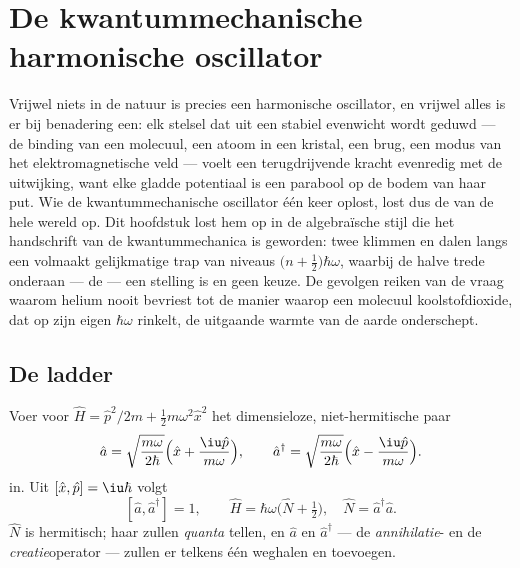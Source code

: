 \chapter{De kwantummechanische harmonische oscillator}\label{ch:b3:harmonic-oscillator}

Vrijwel niets in de natuur is precies een harmonische oscillator, en
vrijwel alles is er bij benadering een: elk stelsel dat uit een stabiel
evenwicht wordt geduwd --- de binding van een molecuul, een atoom in een
kristal, een brug, een modus van het elektromagnetische veld --- voelt een
terugdrijvende kracht evenredig met de uitwijking, want elke gladde
potentiaal is een parabool op de bodem van haar put. Wie de
kwantummechanische oscillator één keer oplost, lost dus de  van de hele wereld op. Dit hoofdstuk lost hem op in de
algebraïsche stijl die het handschrift van de kwantummechanica is geworden:
twee  klimmen en dalen langs een volmaakt gelijkmatige
trap van niveaus $\big(n +
\tfrac12\big)\hbar\omega$, waarbij de halve
trede onderaan --- de  --- een stelling is en geen keuze.
De gevolgen reiken van de vraag waarom helium nooit bevriest tot de manier
waarop een molecuul koolstofdioxide, dat op zijn eigen $\hbar\omega$
rinkelt, de uitgaande warmte van de aarde onderschept.

\section{De ladder}

\begin{definition}[Ladderoperatoren]\label{def:b3:harmonic-oscillator:ladder}
Voer voor $\hat H = \hat p^2/2m + \tfrac12 m\omega^2\hat x^2$ het
dimensieloze, niet-hermitische paar
\[
\hat a = \sqrt{\frac{m\omega}{2\hbar}}\Big(\hat x +
\frac{\iu\hat p}{m\omega}\Big) , \qquad
\hat a^\dagger = \sqrt{\frac{m\omega}{2\hbar}}\Big(\hat x -
\frac{\iu\hat p}{m\omega}\Big) .
\]
in. Uit $[\hat x, \hat p] = \iu\hbar$ volgt
\[
[\hat a, \hat a^\dagger] = 1 , \qquad
\hat H = \hbar\omega\Big(\hat N + \tfrac12\Big) , \quad
\hat N = \hat a^\dagger\hat a .
\]
$\hat N$ is hermitisch; haar  zullen \emph{quanta} tellen, en
$\hat a$ en $\hat a^\dagger$ --- de \emph{annihilatie}- en de
\emph{creatie}operator --- zullen er telkens één weghalen en toevoegen.
\end{definition}

